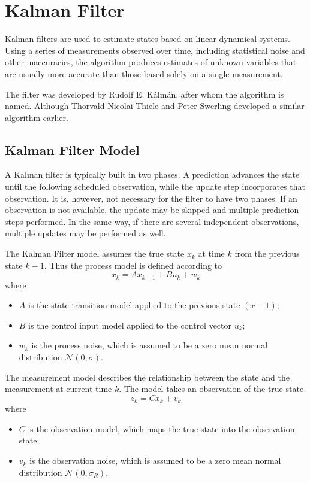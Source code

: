 \section{Kalman Filter}
Kalman filters are used to estimate states based on linear dynamical systems. Using a series of measurements observed over time, including statistical noise and other inaccuracies, the algorithm produces estimates of unknown variables that are usually more accurate than those based solely on a single measurement.

The filter was developed by Rudolf E. Kálmán, after whom the algorithm is named. Although Thorvald Nicolai Thiele and Peter Swerling developed a similar algorithm earlier.\cite{kalman-wiki}

\subsection{Kalman Filter Model}
A Kalman filter is typically built in two phases. A prediction advances the state until the following scheduled observation, while the update step incorporates that observation. It is, however, not necessary for the filter to have two phases. If an observation is not available, the update may be skipped and multiple prediction steps performed. In the same way, if there are several independent observations, multiple updates may be performed as well.\cite{kalman-introduction}

The Kalman Filter model assumes the true state $x_k$ at time ${k}$ from the previous state ${k-1}$. Thus the process model is defined according to
\begin{equation}
    x_{k} = Ax_{k-1} + Bu_{k} + w_{k}
\end{equation}
where
\begin{itemize}
    \item $A$ is the state transition model applied to the previous state $(x-1)$;
    \item $B$ is the control input model applied to the control vector $u_k$;
    \item $w_k$ is the process noise, which is assumed to be a zero mean normal distribution $\mathcal{N} (0, \sigma)$.
\end{itemize}

The measurement model describes the relationship between the state and the measurement at current time $k$. The model takes an observation of the true state  
\begin{equation}
    z_{k} = Cx_{k} + v_{k}
\end{equation}
where
\begin{itemize}
    \item $C$ is the observation model, which maps the true state into the observation state;
    \item $v_k$ is the observation noise, which is assumed to be a zero mean normal distribution $\mathcal{N} (0, \sigma_R)$.
\end{itemize}
